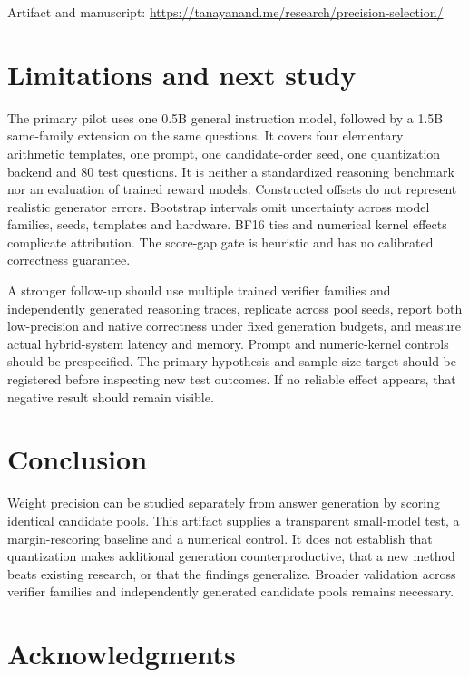 \documentclass[11pt,letterpaper]{article}
\begin{document}
Artifact and manuscript: \href{https://tanayanand.me/research/precision-selection/}{https://tanayanand.me/research/precision-selection/}


\section{Limitations and next study}

The primary pilot uses one 0.5B general instruction model, followed by a 1.5B same-family extension on the same questions. It covers four elementary arithmetic templates, one prompt, one candidate-order seed, one quantization backend and 80 test questions. It is neither a standardized reasoning benchmark nor an evaluation of trained reward models. Constructed offsets do not represent realistic generator errors. Bootstrap intervals omit uncertainty across model families, seeds, templates and hardware. BF16 ties and numerical kernel effects complicate attribution. The score-gap gate is heuristic and has no calibrated correctness guarantee.


A stronger follow-up should use multiple trained verifier families and independently generated reasoning traces, replicate across pool seeds, report both low-precision and native correctness under fixed generation budgets, and measure actual hybrid-system latency and memory. Prompt and numeric-kernel controls should be prespecified. The primary hypothesis and sample-size target should be registered before inspecting new test outcomes. If no reliable effect appears, that negative result should remain visible.


\section{Conclusion}

Weight precision can be studied separately from answer generation by scoring identical candidate pools. This artifact supplies a transparent small-model test, a margin-rescoring baseline and a numerical control. It does not establish that quantization makes additional generation counterproductive, that a new method beats existing research, or that the findings generalize. Broader validation across verifier families and independently generated candidate pools remains necessary.


\section*{Acknowledgments}
\end{document}
